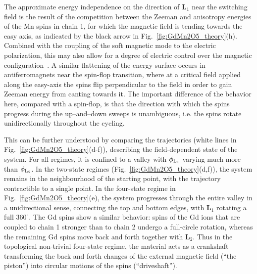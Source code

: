 %
The approximate energy independence on the direction of $\mathbf{L}_1$ near the switching field is the result of the competition between the Zeeman and anisotropy energies of the Mn spins in chain 1, for which the magnetic field is tending towards the easy axis, as indicated by the black arrow in Fig.~\ref{fig:GdMn2O5_theory}(h).
Combined with the coupling of the soft magnetic mode to the electric polarization, this may also allow for a degree of electric control over the magnetic configuration~\cite{Oh14}.
%
A similar flattening of the energy surface occurs in antiferromagnets near the spin-flop transition, where at a critical field applied along the easy-axis the spins flip perpendicular to the field in order to gain Zeeman energy from canting towards it.  
The important difference of the behavior here, compared with a spin-flop, is that the direction with which the spins progress during the up--and--down sweeps is unambiguous, i.e. the spins rotate unidirectionally throughout the cycling.

This can be further understood by comparing the trajectories (white lines in Fig.~\ref{fig:GdMn2O5_theory}(d-f)), describing the field-dependent state of the system. For all regimes, it is confined to a valley with $\phi_{\rm L_1}$ varying much more than $\phi_{\rm L_2}$.
%
In the two-state regimes (Fig.~\ref{fig:GdMn2O5_theory}(d,f)), the system remains in the neighbourhood of the starting point, with the trajectory contractible to a single point. 
In the four-state regime in Fig.~\ref{fig:GdMn2O5_theory}(e), the system progresses through the entire valley in a unidirectional sense, connecting the top and bottom edges, with $\mathbf{L}_1$ rotating a full $360^\circ$.
The Gd spins show a similar behavior: spins of the Gd ions that are coupled to chain 1 stronger than to chain 2 undergo a full-circle rotation, whereas the remaining Gd spins move back and forth together with $\mathbf{L}_2$. Thus in the topological non-trivial four-state regime, the material acts as a crankshaft transforming the back and forth changes of the external magnetic field (``the piston'') into circular motions of the spins (``driveshaft'').

